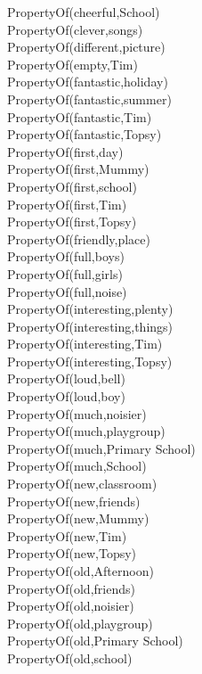 \begin{multicols}{2}
\begin{footnotesize}
PropertyOf(cheerful,School) \\
PropertyOf(clever,songs) \\
PropertyOf(different,picture) \\
PropertyOf(empty,Tim) \\
PropertyOf(fantastic,holiday) \\
PropertyOf(fantastic,summer) \\
PropertyOf(fantastic,Tim) \\
PropertyOf(fantastic,Topsy) \\
PropertyOf(first,day) \\
PropertyOf(first,Mummy) \\
PropertyOf(first,school) \\
PropertyOf(first,Tim) \\
PropertyOf(first,Topsy) \\
PropertyOf(friendly,place) \\
PropertyOf(full,boys) \\
PropertyOf(full,girls) \\
PropertyOf(full,noise) \\
PropertyOf(interesting,plenty) \\
PropertyOf(interesting,things) \\
PropertyOf(interesting,Tim) \\
PropertyOf(interesting,Topsy) \\
PropertyOf(loud,bell) \\
PropertyOf(loud,boy) \\
PropertyOf(much,noisier) \\
PropertyOf(much,playgroup) \\
PropertyOf(much,Primary School) \\
PropertyOf(much,School) \\
PropertyOf(new,classroom) \\
PropertyOf(new,friends) \\
PropertyOf(new,Mummy) \\
PropertyOf(new,Tim) \\
PropertyOf(new,Topsy) \\
PropertyOf(old,Afternoon) \\
PropertyOf(old,friends) \\
PropertyOf(old,noisier) \\
PropertyOf(old,playgroup) \\
PropertyOf(old,Primary School) \\
PropertyOf(old,school) \\

\end{footnotesize}
\end{multicols}
